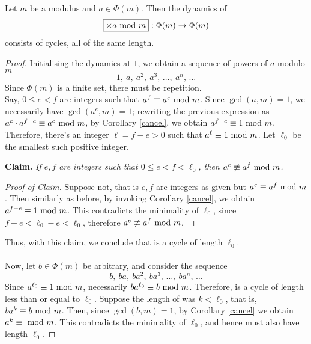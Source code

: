 \vspace*{2em}

\begin{lemma}\label{multcycle}
Let $m$ be a modulus and $a \in \Phi(m)$. Then the dynamics of
\[\fbox{$\times a \text{ mod }{m}$}:\Phi(m) \to \Phi(m)\]
consists of cycles, all of the same length.
\end{lemma}
\begin{proof}
Initialising the dynamics at $1$, we obtain a sequence of powers of $a$ modulo $m$
\[1,\ a,\ a^2,\ a^3,\,\ldots,\ a^n,\,\ldots\label{apow1}\tag{$\star$}\]
Since $\Phi(m)$ is a finite set, there must be repetition.\\[0.5em]
Say, $0\leq e<f$ are integers such that $a^f \equiv a^e \text{ mod }{m}$. Since $\gcd(a,m) = 1$, we necessarily have $\gcd(a^e,m) = 1$; rewriting the previous expression  as $a^e\cdot a^{f-e}\equiv a^e\text{ mod }{m}$, by Corollary \ref{cancel}, we obtain $a^{f-e}\equiv 1\text{ mod }{m}$.\\[0.5em]
Therefore, there's an integer $\ell = f-e>0$ such that $a^\ell \equiv 1\text{ mod }{m}$. Let $\ell_0$ be the smallest such positive integer.\\[0.5em]
\begin{subproof}
{\bf Claim.} \emph{If $e,f$ are integers such that $0\leq e < f < \ell_0$, then $a^e\not\equiv a^f\text{ mod }{m}$.}
\begin{proof}[Proof of Claim]
Suppose not, that is $e,f$ are integers as given but $a^e \equiv a^f\text{ mod }{m}$. Then similarly as before, by invoking Corollary \ref{cancel}, we obtain $a^{f-e} \equiv 1\text{ mod }{m}$. This contradicts the minimality of $\ell_0$, since $f-e < \ell_0 - e < \ell_0$, therefore $a^e\not\equiv a^f\text{ mod }{m}$.
\end{proof}
\vspace*{0.05em}
\end{subproof}
\vspace*{1em}
Thus, with this claim, we conclude that  is a cycle of length $\ell_0$.\\
\\
Now, let $b \in \Phi(m)$ be arbitrary, and consider the sequence
\[b,\ ba,\ ba^2,\ ba^3,\,\ldots,\ ba^n,\,\ldots\label{apow2}\tag{$\star_b$}\]
Since $a^{\ell_0} \equiv 1\text{ mod }{m}$, necessarily $ba^{\ell_0} \equiv b\text{ mod }{m}$. Therefore,  is a cycle of length less than or equal to $\ell_0$. Suppose the length of  was $k < \ell_0$, that is, $ba^k \equiv b\text{ mod }{m}$. Then, since $\gcd(b,m) = 1$, by Corollary \ref{cancel} we obtain $a^k\equiv \text{ mod }{m}$. This contradicts the minimality of $\ell_0$, and hence  must also have length $\ell_0$.
\end{proof}

